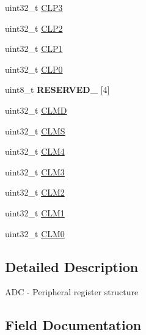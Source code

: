 \begin{DoxyCompactItemize}
\item 
uint32\+\_\+t \hyperlink{struct_a_d_c___mem_map_a6c77f6b67fa1eccf3549bcf27933f5e7}{C\+L\+P3}
\item 
uint32\+\_\+t \hyperlink{struct_a_d_c___mem_map_aac028a79faac6929bebb1b677b2fbf8b}{C\+L\+P2}
\item 
uint32\+\_\+t \hyperlink{struct_a_d_c___mem_map_ae99b44e06b93a2b62451162abe0aae92}{C\+L\+P1}
\item 
uint32\+\_\+t \hyperlink{struct_a_d_c___mem_map_a936082703bd7b18447b8edeeaa3c0c4f}{C\+L\+P0}
\item 
\mbox{\label{struct_a_d_c___mem_map_ab6a26e3e3250e5cf4ee9d2fe63d28a82}} 
uint8\+\_\+t {\bfseries R\+E\+S\+E\+R\+V\+E\+D\+\_} \mbox{[}4\mbox{]}
\item 
uint32\+\_\+t \hyperlink{struct_a_d_c___mem_map_ad78aef04412250c47f943c007ad2eed2}{C\+L\+MD}
\item 
uint32\+\_\+t \hyperlink{struct_a_d_c___mem_map_ad4519a320afe549d5b275b534be9bc39}{C\+L\+MS}
\item 
uint32\+\_\+t \hyperlink{struct_a_d_c___mem_map_a7b8d8ae0f052a3824d3b34dffdf471e0}{C\+L\+M4}
\item 
uint32\+\_\+t \hyperlink{struct_a_d_c___mem_map_a326c171566746f11f9b808930253df85}{C\+L\+M3}
\item 
uint32\+\_\+t \hyperlink{struct_a_d_c___mem_map_a2794a4dac3b6ec18535eeae7c7e2d4e3}{C\+L\+M2}
\item 
uint32\+\_\+t \hyperlink{struct_a_d_c___mem_map_a6c07d3719b54b23926239b53919f36d2}{C\+L\+M1}
\item 
uint32\+\_\+t \hyperlink{struct_a_d_c___mem_map_a1b8eeb87fa8308fe93200b6e82985c25}{C\+L\+M0}
\end{DoxyCompactItemize}


\subsection{Detailed Description}
A\+DC -\/ Peripheral register structure 

\subsection{Field Documentation}
\mbox{\label{struct_a_d_c___mem_map_a2320de82d9559e930bc71650b02993b7}} 
